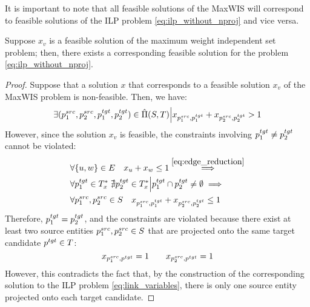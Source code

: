 It is important to note that all feasible solutions of the MaxWIS will
correspond to feasible solutions of the ILP problem \eqref{eq:ilp_without_nproj}
and vice versa.

\begin{lemma} \label{lemma:maxis_f_implies_ilp}
  Suppose \( x_v \) is a feasible solution of the maximum weight independent set
  problem; then, there exists a corresponding feasible solution for the problem
  \eqref{eq:ilp_without_nproj}.
\end{lemma}
\begin{proof}
  Suppose that a solution \( x \) that corresponds to a feasible
  solution \( x_v \) of the MaxWIS problem is non-feasible. Then, we have:
  \[
    \exists (p_1^{src}, p_2^{src}, p_1^{tgt}, p_2^{tgt}) \in \hat{\Pi}(S, T) \Big|
    x_{p_1^{src}, p_1^{tgt}} + x_{p_2^{src}, p_2^{tgt}} > 1
  \]
  However, since the solution \( x_v \) is feasible, the constraints
  involving \( p_1^{tgt} \neq p_2^{tgt} \) cannot be violated:
  \begin{align*}
    & \forall \{ u, w \} \in E \quad x_u + x_w \leq 1 \stackrel{\eqref{eq:edge_reduction}}{\implies}                  \\
    & \forall p_1^{tgt} \in T^*_x \; \nexists p_2^{tgt} \in T^*_x \Big| p_1^{tgt} \cap p_2^{tgt} \neq \emptyset \implies \\
    & \forall p_1^{src}, p_2^{src} \in S \quad x_{p_1^{src}, p_1^{tgt}} + x_{p_2^{src}, p_2^{tgt}} \leq 1
  \end{align*}
  Therefore, \( p_1^{tgt} = p_2^{tgt} \), and the constraints are violated because
  there exist at least two source entities \( p_1^{src}, p_2^{src} \in S \) that are
  projected onto the same target candidate \( p^{tgt} \in T \):
  \[
    x_{p_1^{src}, p^{tgt}} = 1 \qquad x_{p_2^{src}, p^{tgt}} = 1
  \]
  However, this contradicts the fact that, by the construction of the
  corresponding solution to the ILP problem \eqref{eq:link_variables}, there is
  only one source entity projected onto each target candidate.
\end{proof}

